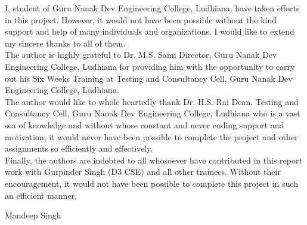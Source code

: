 \begin{Large}
\end{Large}
I, student of Guru Nanak Dev Engineering College, Ludhiana, have taken efforts in this project.
However, it would not have been possible without the kind support and help of many individuals
and organizations. I would like to extend my sincere thanks to all of them.\\
The author is highly grateful to Dr. M.S. Saini Director, Guru Nanak Dev Engineering College, Ludhiana for providing him with the opportunity to carry out his Six Weeks Training at
Testing and Consultancy Cell, Guru Nanak Dev Engineering College, Ludhiana.\\
The author would like to whole heartedly thank Dr. H.S. Rai Dean, Testing and Consultancy
Cell, Guru Nanak Dev Engineering College, Ludhiana who is a vast sea of knowledge and without whose constant and never ending support and motivation, it would never have been possible to complete the project and other assignments so efficiently and effectively.\\
Finally, the authors are indebted to all whosoever have contributed in
this report work with Gurpinder Singh (D3 CSE) and all other trainees. Without their 
encouragement, it would not have been possible to complete this project
in such an efficient manner.





\vskip 1.0cm 
\noindent Mandeep Singh

